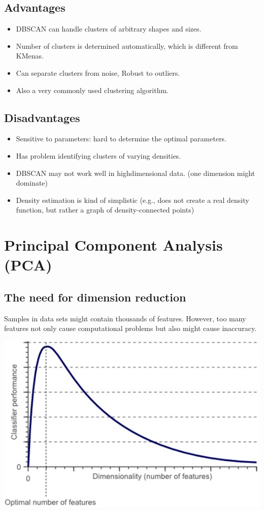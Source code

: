 \documentclass[letterpaper,12pt]{article}
\begin{document}
\subsection{Advantages}
\begin{itemize}
    \item DBSCAN can handle clusters of arbitrary shapes and sizes.
    \item Number of clusters is determined automatically, which is different from K\-Menas.
    \item Can separate clusters from noise, Robust to outliers.
    \item Also a very commonly used clustering algorithm.
\end{itemize}

\subsection{Disadvantages}
\begin{itemize}
    \item Sensitive to parameters: hard to determine the optimal parameters.
    \item Has problem identifying clusters of varying densities.
    \item DBSCAN may not work well in high\-dimensional data. (one dimension might dominate)
    \item Density estimation is kind of simplistic (e.g., does not create a real density function, but rather a graph of density-connected points)
\end{itemize}

\section{Principal Component Analysis (PCA)}
\subsection{The need for dimension reduction}
Samples in data sets might contain thousands of features. However, too many features not only cause computational problems but also might cause inaccuracy. 

\includegraphics*{Image/Classifier performance V.S. Dimensionality.jpg}
\end{document}
